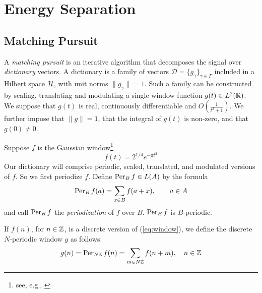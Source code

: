 \section{Energy Separation}
\subsection{Matching Pursuit}
\label{sec:MP}
A \emph{matching pursuit} \cite{Mallat:1993} is an iterative algorithm
that decomposes the signal over \emph{dictionary} vectors.
A dictionary is a family of vectors 
$\mathcal{D}= \{g_\gamma\}_{\gamma\in\Gamma}$ 
included in a Hilbert space $\mathcal{H}$, with unit norms
$\|g_\gamma\|=1$.  Such a family can be constructed by scaling,
translating and modulating a single window function $g(t) \in L^2(\mathbb{R})$.
We suppose that $g(t)$ is real, continuously differentiable and
$O(\frac{1}{t^2+1})$.  We further impose that $\|g\|=1$, that the
integral of $g(t)$ is non-zero, and that $g(0)\neq 0$.

Suppose $f$ is the Gaussian window\footnote{see, e.g., \cite{Mallat:1993}}
\begin{equation}\label{eq:window}
f(t) = 2^{1/4}e^{-\pi t^2}
\end{equation}
Our dictionary will comprise periodic, scaled, translated, and modulated
versions of $f$.  So we first periodize $f$.  
Define $\operatorname{Per}_{B}f \in L(A)$ by the formula
\[
\operatorname{Per}_{B}f(a) = \sum_{x\in B} f(a+x), \qquad a \in A
\]
and call $\operatorname{Per} _Bf$ the \emph{periodization} of $f$ over $B$.  $\operatorname{Per} _Bf$ is
 $B$-periodic.  

If $f(n)$, for $n \in \mathbb{Z}$, is a discrete version of (\ref{eq:window}), we define
the discrete $N$-periodic window $g$ as follows:
\[
g(n) = \operatorname{Per} _{N\mathbb{Z}}f(n) = \sum_{m\in N\mathbb{Z}} f(n+m), \quad n \in \mathbb{Z}
\]

